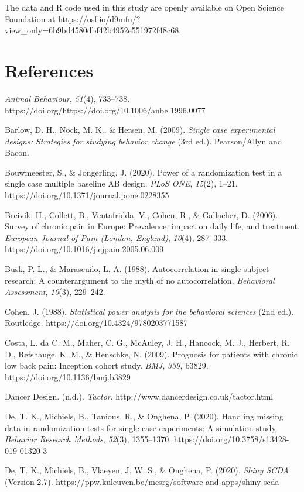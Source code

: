 \documentclass{article}
\begin{document}
The data and R code used in this study are openly available on Open Science Foundation at https://osf.io/d9mfn/?view\_only=6b9bd4580dbf42b4952e551972f48c68.



\section{References}

\emph{Animal Behaviour}, \emph{51}(4), 733--738. https://doi.org/https://doi.org/10.1006/anbe.1996.0077

Barlow, D. H., Nock, M. K., \& Hersen, M. (2009). \emph{Single case experimental designs: Strategies for studying behavior change} (3rd ed.). Pearson/Allyn and Bacon.

Bouwmeester, S., \& Jongerling, J. (2020). Power of a randomization test in a single case multiple baseline AB design. \emph{PLoS ONE}, \emph{15}(2), 1--21. https://doi.org/10.1371/journal.pone.0228355

Breivik, H., Collett, B., Ventafridda, V., Cohen, R., \& Gallacher, D. (2006). Survey of chronic pain in Europe: Prevalence, impact on daily life, and treatment. \emph{European Journal of Pain (London, England)}, \emph{10}(4), 287--333. https://doi.org/10.1016/j.ejpain.2005.06.009

Busk, P. L., \& Marascuilo, L. A. (1988). Autocorrelation in single-subject research: A counterargument to the myth of no autocorrelation. \emph{Behavioral Assessment}, \emph{10}(3), 229--242.

Cohen, J. (1988). \emph{Statistical power analysis for the behavioral sciences} (2nd ed.). Routledge. https://doi.org/10.4324/9780203771587

Costa, L. da C. M., Maher, C. G., McAuley, J. H., Hancock, M. J., Herbert, R. D., Refshauge, K. M., \& Henschke, N. (2009). Prognosis for patients with chronic low back pain: Inception cohort study. \emph{BMJ}, \emph{339}, b3829. https://doi.org/10.1136/bmj.b3829

Dancer Design. (n.d.). \emph{Tactor}. http://www.dancerdesign.co.uk/tactor.html

De, T. K., Michiels, B., Tanious, R., \& Onghena, P. (2020). Handling missing data in randomization tests for single-case experiments: A simulation study. \emph{Behavior Research Methods}, \emph{52}(3), 1355--1370. https://doi.org/10.3758/s13428-019-01320-3

De, T. K., Michiels, B., Vlaeyen, J. W. S., \& Onghena, P. (2020). \emph{Shiny SCDA} (Version 2.7). https://ppw.kuleuven.be/mesrg/software-and-apps/shiny-scda
\end{document}
